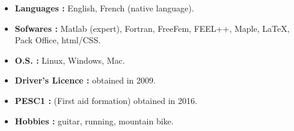 \documentclass[10pt,a4paper]{report}
\begin{document}
\vspace{1cm}
\noindent
\begin{itemize}
\item \textbf{Languages :} English, French (native language).
\item \textbf{Sofwares :} Matlab (expert), Fortran, FreeFem, FEEL++, Maple, \LaTeX, Pack Office, html/CSS.
\item \textbf{O.S. :} Linux, Windows, Mac.
\item \textbf{Driver's Licence :} obtained in 2009.
\item \textbf{PESC1 :} (First aid formation) obtained in 2016.
\item \textbf{Hobbies :} guitar, running, mountain bike.

\end{itemize}
\end{document}

